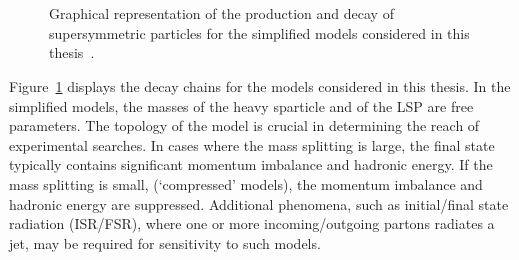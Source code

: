 \begin{figure}[h!]
  \begin{center}
     ~~
     \\
     ~~
    \caption{
      Graphical representation of the production and decay of supersymmetric particles 
      for the simplified models considered in this thesis~\cite{SMS}.
    }
    \label{fig:simplified-models-feyn}
  \end{center}
\end{figure}

Figure~\ref{fig:simplified-models-feyn} displays the decay chains for the models considered in this thesis. 
In the simplified models, the masses of the heavy sparticle and of the LSP are free parameters.
The topology of the model is crucial in determining the reach of experimental searches. 
In cases where the mass splitting is large, the final state typically contains significant
momentum imbalance and hadronic energy. If the mass splitting is small, (`compressed' models),
the momentum imbalance and hadronic energy are suppressed. Additional phenomena, such as initial/final state radiation (ISR/FSR), 
where one or more incoming/outgoing partons radiates a jet, may be required for sensitivity to such models.

